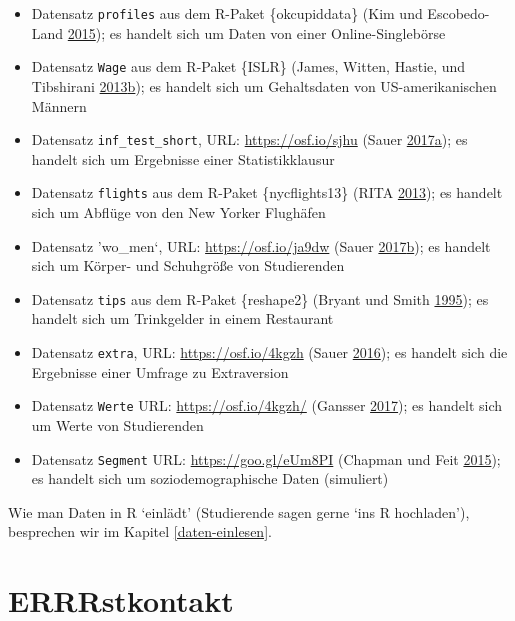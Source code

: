 \documentclass[12pt,ngerman,]{book}
\providecommand{\tightlist}{%
  \setlength{\itemsep}{0pt}\setlength{\parskip}{0pt}}
\theoremstyle{definition}
\theoremstyle{definition}
\theoremstyle{remark}
\begin{document}
\begin{itemize}
\tightlist
\item
  Datensatz \texttt{profiles} aus dem R-Paket \{okcupiddata\} (Kim und
  Escobedo-Land \protect\hyperlink{ref-kim2015okcupid}{2015}); es
  handelt sich um Daten von einer Online-Singlebörse
\item
  Datensatz \texttt{Wage} aus dem R-Paket \{ISLR\} (James, Witten,
  Hastie, und Tibshirani
  \protect\hyperlink{ref-introstatlearning}{2013}\protect\hyperlink{ref-introstatlearning}{b});
  es handelt sich um Gehaltsdaten von US-amerikanischen Männern
\item
  Datensatz \texttt{inf\_test\_short}, URL: \url{https://osf.io/sjhu}
  (Sauer
  \protect\hyperlink{ref-Sauer_2017}{2017}\protect\hyperlink{ref-Sauer_2017}{a});
  es handelt sich um Ergebnisse einer Statistikklausur
\item
  Datensatz \texttt{flights} aus dem R-Paket \{nycflights13\} (RITA
  \protect\hyperlink{ref-nycflights13}{2013}); es handelt sich um
  Abflüge von den New Yorker Flughäfen
\item
  Datensatz 'wo\_men`, URL: \url{https://osf.io/ja9dw} (Sauer
  \protect\hyperlink{ref-Sauer_2017a}{2017}\protect\hyperlink{ref-Sauer_2017a}{b});
  es handelt sich um Körper- und Schuhgröße von Studierenden
\item
  Datensatz \texttt{tips} aus dem R-Paket \{reshape2\} (Bryant und Smith
  \protect\hyperlink{ref-bryant1995practical}{1995}); es handelt sich um
  Trinkgelder in einem Restaurant
\item
  Datensatz \texttt{extra}, URL: \url{https://osf.io/4kgzh} (Sauer
  \protect\hyperlink{ref-Sauer_2016}{2016}); es handelt sich die
  Ergebnisse einer Umfrage zu Extraversion
\item
  Datensatz \texttt{Werte} URL: \url{https://osf.io/4kgzh/} (Gansser
  \protect\hyperlink{ref-Gansser_2017}{2017}); es handelt sich um Werte
  von Studierenden
\item
  Datensatz \texttt{Segment} URL: \url{https://goo.gl/eUm8PI} (Chapman
  und Feit \protect\hyperlink{ref-Chapman2015}{2015}); es handelt sich
  um soziodemographische Daten (simuliert)
\end{itemize}

Wie man Daten in R `einlädt' (Studierende sagen gerne `ins R
hochladen'), besprechen wir im Kapitel \ref{daten-einlesen}.

\section{ERRRstkontakt}\label{errrstkontakt}
\end{document}
